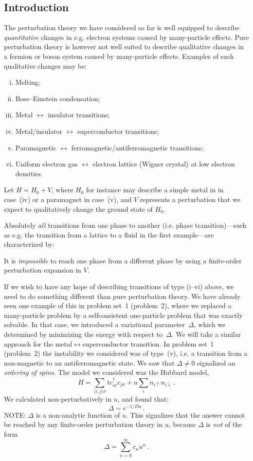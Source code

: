 \subsection{Introduction}
The perturbation theory we have considered so far is well equipped to describe \emph{quantitative} changes in e.g. electron systems caused by many-particle effects.
Pure perturbation theory is however not well suited to describe qualitative changes in a fermion or boson system caused by many-particle effects.
Examples of such qualitative changes may be:
\begin{enumerate}[(i)]
  \item Melting;
  \item Bose--Einstein condensation;
  \item Metal $\leftrightarrow$ insulator transitions;
  \item Metal/insulator  $\leftrightarrow$ superconductor transitions;
  \item Paramagnetic $\leftrightarrow$ ferromagnetic/antiferromagnetic transitions;
  \item Uniform electron gas $\leftrightarrow$ electron lattice (Wigner crystal) at low electron densities.
\end{enumerate}
Let $H = H_0 + V$, where $H_0$ for instance may describe a simple metal in in case~(iv) or a paramagnet in case~(v), and $V$ represents a perturbation that we expect to qualitatively change the ground state of $H_0$.

Absolutely \emph{all} transitions from one phase to another (i.e. phase transition)---such as e.g. the transition from a lattice to a fluid in the first example---are characterized by:

\begin{Indent}
  It is \emph{impossible} to reach one phase from a different phase by using a finite-order perturbation expansion in $V$.
\end{Indent}

If we wish to have any hope of describing transitions of type (i--vi) above, we need to do something different than pure perturbation theory.
We have already seen one example of this in problem set~1 (problem~2), where we replaced a many-particle problem by a selfconsistent one-particle problem that was exactly solvable.
In that case, we introduced a variational parameter~$\Delta$, which we determined by minimizing the energy with respect to~$\Delta$.
We will take a similar approach for the metal$\leftrightarrow$superconductor transition.
In problem set~1 (problem~2) the instability we considered was of type~(v), i.e. a transition from a non-magnetic to an antiferromagnetic state.
We saw that $\Delta\neq0$ signalized an \emph{ordering of spins}.
The model we considered was the Hubbard model,
\[
  H = \sum_{\langle i,j \rangle \sigma} t c^\dagger_{i\sigma} c_{j\sigma} + u\sum_i n_{i\uparrow} n_{i\downarrow} \,.
\]
We calculated non-perturbatively in $u$, and found that:
\[
  \Delta \sim e^{-1/Du} \,.
\]
NOTE: $\Delta$ is a non-analytic function of $u$.
This signalizes that the answer cannot be reached by any finite-order perturbation theory in $u$, because $\Delta$ is \emph{not} of the form
\[
  \Delta = \sum_{n=0}^\infty c_n u^n\,.
\]



